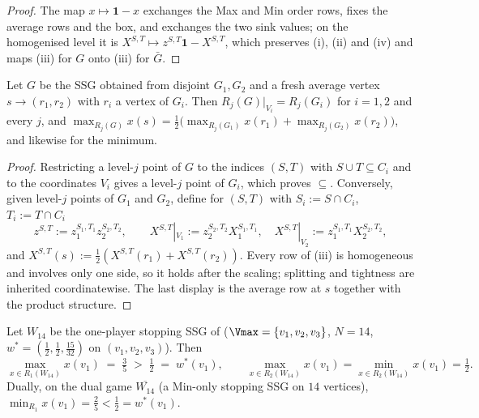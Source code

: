 \begin{proof}
The map $x\mapsto\mathbf 1-x$ exchanges the Max and Min order rows, fixes the
average rows and the box, and exchanges the two sink values; on the homogenised
level it is $X^{S,T}\mapsto z^{S,T}\mathbf 1-X^{S,T}$, which preserves (i),
(ii) and (iv) and maps (iii) for $G$ onto (iii) for $\bar G$.
\end{proof}

\begin{proposition}\label{cl:union}
Let $G$ be the SSG obtained from disjoint $G_1,G_2$ and a fresh average vertex
$s\to(r_1,r_2)$ with $r_i$ a vertex of $G_i$. Then
$R_j(G)|_{V_i}=R_j(G_i)$ for $i=1,2$ and every $j$, and
$\max_{R_j(G)}x(s)=\frac12\bigl(\max_{R_j(G_1)}x(r_1)+\max_{R_j(G_2)}x(r_2)\bigr)$,
and likewise for the minimum.
\end{proposition}

\begin{proof}
Restricting a level-$j$ point of $G$ to the indices $(S,T)$ with
$S\cup T\subseteq C_i$ and to the coordinates $V_i$ gives a level-$j$ point of
$G_i$, which proves $\subseteq$. Conversely, given level-$j$ points of $G_1$
and $G_2$, define for $(S,T)$ with $S_i:=S\cap C_i$, $T_i:=T\cap C_i$
\[
  z^{S,T}:=z_1^{S_1,T_1}z_2^{S_2,T_2},\qquad
  X^{S,T}|_{V_1}:=z_2^{S_2,T_2}X_1^{S_1,T_1},\quad
  X^{S,T}|_{V_2}:=z_1^{S_1,T_1}X_2^{S_2,T_2},
\]
and $X^{S,T}(s):=\frac12(X^{S,T}(r_1)+X^{S,T}(r_2))$. Every row of (iii) is
homogeneous and involves only one side, so it holds after the scaling;
splitting and tightness are inherited coordinatewise. The last display is the
average row at $s$ together with the product structure.
\end{proof}

\begin{theorem}\label{cl:gap-one}
Let $W_{14}$ be the one-player stopping SSG of 
($\Vmax=\{v_1,v_2,v_3\}$, $N=14$, $w^{\ast}=(\frac12,\frac12,\frac{15}{32})$ on
$(v_1,v_2,v_3)$). Then
\[
  \max_{x\in R_1(W_{14})}x(v_1)\;=\;\tfrac35\;>\;\tfrac12\;=\;w^{\ast}(v_1),
  \qquad
  \max_{x\in R_2(W_{14})}x(v_1)=\min_{x\in R_2(W_{14})}x(v_1)=\tfrac12 .
\]
Dually, on the dual game $\overline{W_{14}}$ (a Min-only stopping SSG on $14$
vertices), $\min_{R_1}x(v_1)=\frac25<\frac12=w^{\ast}(v_1)$.
\end{theorem}

